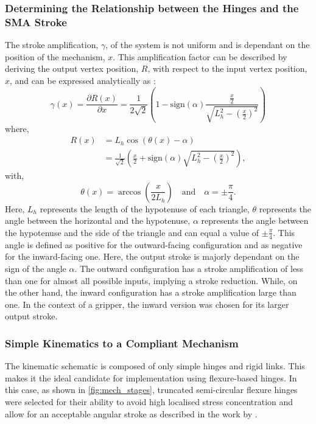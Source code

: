 \subsubsection{Determining the Relationship between the Hinges and the SMA Stroke}
The stroke amplification, $\gamma$, of the system is not uniform and is dependant on the position of the mechanism, $x$. This amplification factor can be described by deriving the output vertex position, $R$, with respect to the input vertex position, $x$, and can be expressed analytically as :
\begin{equation}
\gamma(x) = \frac{\partial R(x)}{\partial x} = \frac{1}{2\sqrt{2}}\left(1-\text{sign}(\alpha)\frac{\frac{x}{2}}{\sqrt{L_{h}^2-\left(\frac{x}{2}\right)^2}} \right)
\label{eq:1}
\end{equation}
where,
\begin{equation}
\begin{split}
    R(x) &= L_{h}\cos\left(\theta(x) - \alpha\right)\\
     &= \frac{1}{\sqrt{2}} \left(\frac{x}{2} +\text{sign}(\alpha) \sqrt{L_{h}^2-\left(\frac{x}{2}\right)^2}\right),
    \label{eq:7}
\end{split}
\end{equation}
with,
\begin{equation}
\theta(x) = \arccos{\left(\frac{x}{2L_{h}}\right)} \quad \text{and} \quad \alpha=\pm\frac{\pi}{4}.
\label{eq:theta}
\end{equation}
Here, $L_h$ represents the length of the hypotenuse of each triangle, $\theta$ represents the angle between the horizontal and the hypotenuse, $\alpha$ represents the angle between the hypotenuse and the side of the triangle and can equal a value of $\pm\frac{\pi}{4}$. This angle is defined as positive for the outward-facing configuration and as negative for the inward-facing one. Here, the output stroke is majorly dependant on the sign of the angle $\alpha$. The outward configuration has a stroke amplification of less than one for almost all possible inputs, implying a stroke reduction. While, on the other hand, the inward configuration has a stroke amplification large than one. In the context of a gripper, the inward version was chosen for its larger output stroke.

\subsubsection{Simple Kinematics to a Compliant Mechanism}
The kinematic schematic is composed of only simple hinges and rigid links. This makes it the ideal candidate for implementation using flexure-based hinges. In this case, as shown in \cref{fig:mech_stages}, truncated semi-circular flexure hinges were selected for their ability to avoid high localised stress concentration and allow for an acceptable angular stroke as described in the work by \cite{torresmelgarejoModelingBendingStiffness2018}.

